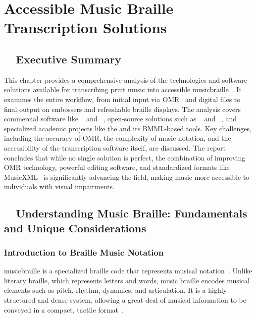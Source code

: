\chapter{Accessible Music Braille Transcription Solutions}\label{ch10:music-braille}
\raggedright

\section{~~Executive Summary}\label{ch10:sec:executive-summary}
This chapter provides a comprehensive analysis of the technologies and software solutions available for transcribing print music into accessible \gls{musicbraille}~\supercite{braillemusicandmore-guide,rnib-braille-music}. It examines the entire workflow, from initial input via \gls{OMR}~\supercite{musescore-omr,sachindae-polyphonic-omr} and digital files to final output on embossers and refreshable braille displays. The analysis covers commercial software like ~\supercite{dancingdots-goodfeel} and ~\supercite{DuxburyDBT}, open-source solutions such as ~\supercite{musescore-accessibility} and ~\supercite{aph-brailleblaster}, and specialized academic projects like the  and its \gls{BMML}-based tools. Key challenges, including the accuracy of OMR, the complexity of music notation, and the accessibility of the transcription software itself, are discussed. The report concludes that while no single solution is perfect, the combination of improving OMR technology, powerful editing software, and standardized formats like \gls{MusicXML}~\supercite{daisy-musicxml} is significantly advancing the field, making music more accessible to individuals with visual impairments.

\section{~~Understanding Music Braille: Fundamentals and Unique Considerations}\label{ch10:sec:understanding-music-braille}

\subsection{Introduction to Braille Music Notation}\label{ch10:ssec:intro-to-music-braille}
\gls{musicbraille} is a specialized braille code that represents musical notation~\supercite{loc-braille-intervals}. Unlike literary braille, which represents letters and words, music braille encodes musical elements such as pitch, rhythm, dynamics, and articulation. It is a highly structured and dense system, allowing a great deal of musical information to be conveyed in a compact, tactile format~\supercite{braillemusicandmore-guide}.

